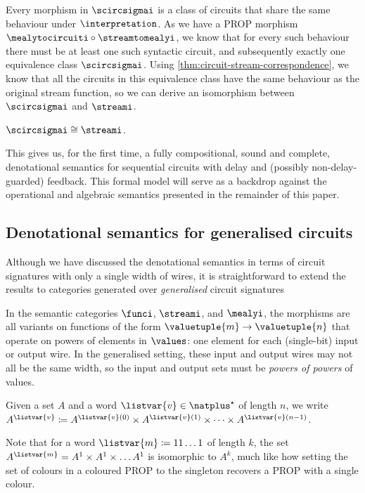 \documentclass{lmcs}
\begin{document}
Every morphism in \(\scircsigmai\) is a class of circuits that share the
same behaviour under \(\interpretation\).
As we have a PROP morphism \(\mealytocircuiti \circ \streamtomealyi\), we know
that for every such behaviour there must be at least one such syntactic circuit,
and subsequently exactly one equivalence class \(\scircsigmai\).
Using \autoref{thm:circuit-stream-correspondence}, we know that all the circuits in
this equivalence class have the same behaviour as the original stream function,
so we can derive an isomorphism between \(\scircsigmai\) and
\(\streami\).

\begin{cor}
    \(\scircsigmai \cong \streami\).
\end{cor}

This gives us, for the first time, a fully compositional, sound and complete,
denotational semantics for sequential circuits with delay and (possibly
non-delay-guarded) feedback.
This formal model will serve as a backdrop against the operational and
algebraic semantics presented in the remainder of this paper.

\subsection{Denotational semantics for generalised circuits}

Although we have discussed the denotational semantics in terms of circuit
signatures with only a single width of wires, it is straightforward to extend
the results to categories
generated over \emph{generalised} circuit signatures

In the semantic categories \(\funci\), \(\streami\), and \(\mealyi\), the
morphisms are all variants on functions of the form
\(\valuetuple{m} \to \valuetuple{n}\) that operate on powers of elements in
\(\values\): one element for each (single-bit) input or output wire.
In the generalised setting, these input and output wires may not all be the
same width, so the input and output sets must be \emph{powers of powers} of
values.

\begin{nota}
    Given a set \(A\) and a word \(\listvar{v} \in \natplus^\star\) of
    length \(n\), we write \(
    A^{\listvar{v}}
    \coloneqq
    A^{\listvar{v}(0)}
    \times
    A^{\listvar{v}(1)}
    \times
    \dots
    \times
    A^{\listvar{v}(n-1)}
    \).
\end{nota}

Note that for a word \(\listvar{m} \coloneqq 11\dots1\) of length \(k\), the set
\(A^{\listvar{m}} = A^1 \times A^1 \times \dots A^1\) is isomorphic to \(A^k\),
much like how setting the set of colours in a coloured PROP to the singleton
recovers a PROP with a single colour.
\end{document}
